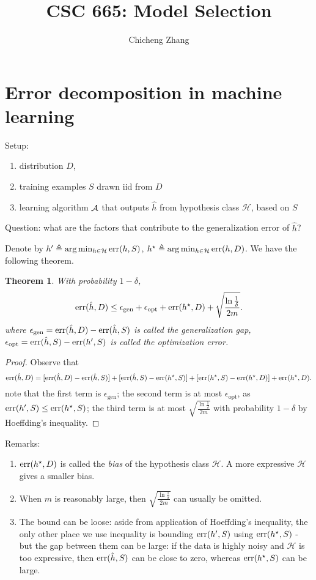 \documentclass{article}
\title{CSC 665: Model Selection}
\author{Chicheng Zhang}
\newtheorem{theorem}{Theorem}
\DeclareMathOperator*{\err}{{\rm err}}
\DeclareMathOperator*{\Acal}{{\cal A}}
\newcommand{\Hcal}{\mathcal{H}}
\newcommand{\defeq}{\triangleq}
\begin{document}
\maketitle

\section{Error decomposition in machine learning}
Setup:
\begin{enumerate}
  \item distribution $D$,
  \item training examples $S$ drawn iid from $D$
  \item learning algorithm $\Acal$ that outputs $\hat{h}$ from hypothesis class
  $\Hcal$, based on $S$
\end{enumerate}

Question: what are the factors that contribute to the generalization error
of $\hat{h}$?

Denote by $h' \defeq \arg\min_{h \in \Hcal} \err(h, S)$, $h^\star \defeq \arg\min_{h \in \Hcal} \err(h, D)$. We have the following theorem.

\begin{theorem}
With probability $1-\delta$,
\[ \err(\hat{h}, D) \leq \epsilon_{\text{gen}} + \epsilon_{\text{opt}} + \err(h^\star, D) + \sqrt{\frac{\ln\frac1\delta}{2m}}. \]
where $\epsilon_{\text{gen}} = \err(\hat{h}, D) - \err(\hat{h}, S)$ is called the {\em generalization gap},
$\epsilon_{\text{opt}} = \err(\hat{h}, S) - \err(h', S)$ is called the {\em optimization error}.
\end{theorem}

\begin{proof}
Observe that
\[ \err(\hat{h}, D) = [\err(\hat{h}, D) - \err(\hat{h}, S)] + [\err(\hat{h}, S) - \err(h^\star, S)] + [\err(h^\star, S) - \err(h^\star, D)] + \err(h^\star, D). \]
note that the first term is $\epsilon_{\text{gen}}$;
the second term is at most $\epsilon_{\text{opt}}$, as $\err(h', S) \leq \err(h^\star, S)$;
the third term is at most $\sqrt{\frac{\ln\frac1\delta}{2m}}$ with probability $1-\delta$ by Hoeffding's inequality.
\end{proof}

Remarks:
\begin{enumerate}
\item $\err(h^\star, D)$ is called the {\em bias} of the hypothesis class $\Hcal$. A more expressive $\Hcal$ gives a smaller bias.
\item When $m$ is reasonably large, then $\sqrt{\frac{\ln\frac1\delta}{2m}}$ can usually be omitted.
\item The bound can be loose: aside from application of Hoeffding's inequality, the only other place we use inequality is bounding $\err(h', S)$ using $\err(h^\star, S)$ - but the gap between them can be large: if the data is highly noisy and $\Hcal$ is too expressive, then $\err(\hat{h}, S)$ can be close to zero, whereas $\err(h^\star, S)$ can be large.
\end{enumerate}
\end{document}
